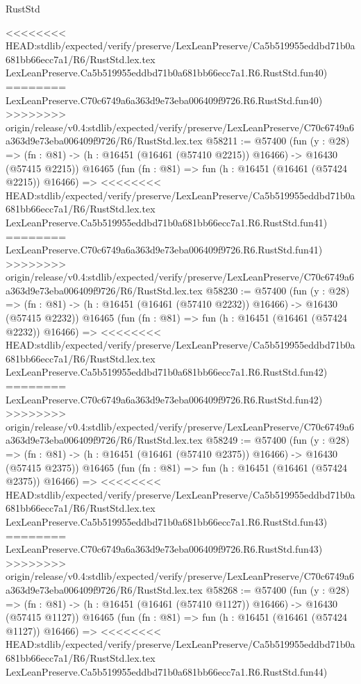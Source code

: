 \begin{lexlean}{RustStd}
\begin{coremodule}
{\begin{coremodule}
{{{{{{{{{{{{{{{{{{{{{{{{{{{{{{{{{{{{{{{{{{{{{{{{{{{{{{{<<<<<<<< HEAD:stdlib/expected/verify/preserve/LexLeanPreserve/Ca5b519955eddbd71b0a681bb66ecc7a1/R6/RustStd.lex.tex
    LexLeanPreserve.Ca5b519955eddbd71b0a681bb66ecc7a1.R6.RustStd.fun40)
========
    LexLeanPreserve.C70c6749a6a363d9e73eba006409f9726.R6.RustStd.fun40)
>>>>>>>> origin/release/v0.4:stdlib/expected/verify/preserve/LexLeanPreserve/C70c6749a6a363d9e73eba006409f9726/R6/RustStd.lex.tex
@58211 := @57400
    (fun (y : @28) =>
    (fn : @81) -> (h : @16451 (@16461 (@57410 @2215)) @16466) -> @16430 (@57415 @2215))
    @16465
    (fun (fn : @81) =>
    fun (h : @16451 (@16461 (@57424 @2215)) @16466) =>
<<<<<<<< HEAD:stdlib/expected/verify/preserve/LexLeanPreserve/Ca5b519955eddbd71b0a681bb66ecc7a1/R6/RustStd.lex.tex
    LexLeanPreserve.Ca5b519955eddbd71b0a681bb66ecc7a1.R6.RustStd.fun41)
========
    LexLeanPreserve.C70c6749a6a363d9e73eba006409f9726.R6.RustStd.fun41)
>>>>>>>> origin/release/v0.4:stdlib/expected/verify/preserve/LexLeanPreserve/C70c6749a6a363d9e73eba006409f9726/R6/RustStd.lex.tex
@58230 := @57400
    (fun (y : @28) =>
    (fn : @81) -> (h : @16451 (@16461 (@57410 @2232)) @16466) -> @16430 (@57415 @2232))
    @16465
    (fun (fn : @81) =>
    fun (h : @16451 (@16461 (@57424 @2232)) @16466) =>
<<<<<<<< HEAD:stdlib/expected/verify/preserve/LexLeanPreserve/Ca5b519955eddbd71b0a681bb66ecc7a1/R6/RustStd.lex.tex
    LexLeanPreserve.Ca5b519955eddbd71b0a681bb66ecc7a1.R6.RustStd.fun42)
========
    LexLeanPreserve.C70c6749a6a363d9e73eba006409f9726.R6.RustStd.fun42)
>>>>>>>> origin/release/v0.4:stdlib/expected/verify/preserve/LexLeanPreserve/C70c6749a6a363d9e73eba006409f9726/R6/RustStd.lex.tex
@58249 := @57400
    (fun (y : @28) =>
    (fn : @81) -> (h : @16451 (@16461 (@57410 @2375)) @16466) -> @16430 (@57415 @2375))
    @16465
    (fun (fn : @81) =>
    fun (h : @16451 (@16461 (@57424 @2375)) @16466) =>
<<<<<<<< HEAD:stdlib/expected/verify/preserve/LexLeanPreserve/Ca5b519955eddbd71b0a681bb66ecc7a1/R6/RustStd.lex.tex
    LexLeanPreserve.Ca5b519955eddbd71b0a681bb66ecc7a1.R6.RustStd.fun43)
========
    LexLeanPreserve.C70c6749a6a363d9e73eba006409f9726.R6.RustStd.fun43)
>>>>>>>> origin/release/v0.4:stdlib/expected/verify/preserve/LexLeanPreserve/C70c6749a6a363d9e73eba006409f9726/R6/RustStd.lex.tex
@58268 := @57400
    (fun (y : @28) =>
    (fn : @81) -> (h : @16451 (@16461 (@57410 @1127)) @16466) -> @16430 (@57415 @1127))
    @16465
    (fun (fn : @81) =>
    fun (h : @16451 (@16461 (@57424 @1127)) @16466) =>
<<<<<<<< HEAD:stdlib/expected/verify/preserve/LexLeanPreserve/Ca5b519955eddbd71b0a681bb66ecc7a1/R6/RustStd.lex.tex
    LexLeanPreserve.Ca5b519955eddbd71b0a681bb66ecc7a1.R6.RustStd.fun44)
}}}}}}}}}}}}}}}}}}}}}}}}}}}}}}}}}}}}}}}}}}}}}}}}}}}}}}}
\end{coremodule}}
\end{coremodule}
\end{lexlean}
